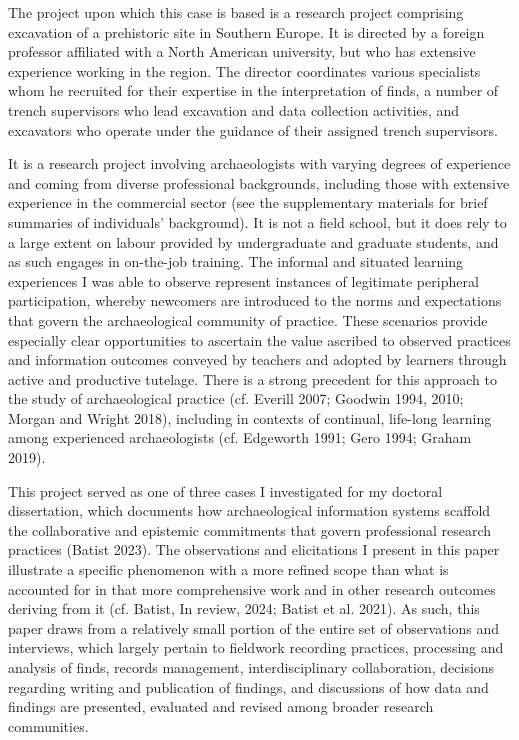 \documentclass[
]{article}
\begin{document}
The project upon which this case is based is a research project
comprising excavation of a prehistoric site in Southern Europe. It is
directed by a foreign professor affiliated with a North American
university, but who has extensive experience working in the region. The
director coordinates various specialists whom he recruited for their
expertise in the interpretation of finds, a number of trench supervisors
who lead excavation and data collection activities, and excavators who
operate under the guidance of their assigned trench supervisors.

It is a research project involving archaeologists with varying degrees
of experience and coming from diverse professional backgrounds,
including those with extensive experience in the commercial sector (see
the supplementary materials for brief summaries of individuals'
background). It is not a field school, but it does rely to a large
extent on labour provided by undergraduate and graduate students, and as
such engages in on-the-job training. The informal and situated learning
experiences I was able to observe represent instances of legitimate
peripheral participation, whereby newcomers are introduced to the norms
and expectations that govern the archaeological community of practice.
These scenarios provide especially clear opportunities to ascertain the
value ascribed to observed practices and information outcomes conveyed
by teachers and adopted by learners through active and productive
tutelage. There is a strong precedent for this approach to the study of
archaeological practice (cf. Everill 2007; Goodwin 1994, 2010; Morgan
and Wright 2018), including in contexts of continual, life-long learning
among experienced archaeologists (cf. Edgeworth 1991; Gero 1994; Graham
2019).

This project served as one of three cases I investigated for my doctoral
dissertation, which documents how archaeological information systems
scaffold the collaborative and epistemic commitments that govern
professional research practices (Batist 2023). The observations and
elicitations I present in this paper illustrate a specific phenomenon
with a more refined scope than what is accounted for in that more
comprehensive work and in other research outcomes deriving from it (cf.
Batist, In review, 2024; Batist et al. 2021). As such, this paper draws
from a relatively small portion of the entire set of observations and
interviews, which largely pertain to fieldwork recording practices,
processing and analysis of finds, records management, interdisciplinary
collaboration, decisions regarding writing and publication of findings,
and discussions of how data and findings are presented, evaluated and
revised among broader research communities.
\end{document}
